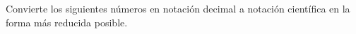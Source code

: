 \documentclass[12pt,addpoints]{evalua}
\begin{document}
\begin{questions}
      \question[15] Convierte los siguientes números en notación decimal a notación científica en la forma más reducida posible.
      \begin{multicols}{2}
      \end{multicols}


\end{questions}
\end{document}
